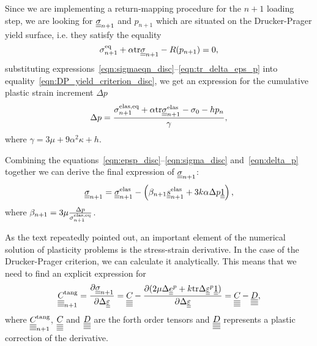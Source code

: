 \documentclass[12pt]{article}
\begin{document}
\begin{appendices}
    Since we are implementing a return-mapping procedure for the $n + 1$ loading step, we are looking for $\underline{\underline{\sigma}}_{n+1}$ and $p_{n+1}$ which are situated on the Drucker-Prager yield surface, i.e. they satisfy the equality 
    \begin{equation}\label{eqn:DP_yield_criterion_disc}
        \sigma_{n+1}^\text{eq} + \alpha \mathrm{tr} \underline{\underline{\sigma}}_{n+1} - R(p_{n+1}) = 0,
    \end{equation}
    substituting expressions~\eqref{eqn:sigmaeqn_disc}--\eqref{eqn:tr_delta_eps_p} into equality~\eqref{eqn:DP_yield_criterion_disc}, we get an expression for the cumulative plastic strain increment $\Delta p$
    \begin{equation}\label{eqn:delta_p}
        \Delta p = \frac{ \sigma_{n+1}^\text{elas,eq} + \alpha \mathrm{tr} \underline{\underline{\sigma}}_{n+1}^{\text{elas}} - \sigma_0 - h p_n}{ \gamma },
    \end{equation}
    where $\gamma = 3\mu + 9\alpha^2\kappa + h$.
    
    Combining the equations~\eqref{eqn:epsp_disc}--\eqref{eqn:sigma_disc} and~\eqref{eqn:delta_p} together we can derive the final expression of $\underline{\underline{\sigma}}_{n+1}$:
    \begin{equation}
        \underline{\underline{\sigma}}_{n+1} = \underline{\underline{\sigma}}_{n+1}^\text{elas} - \left( \beta_{n+1} \underline{\underline{s}}_{n+1}^\text{elas} + 3k\alpha \Delta p \underline{\underline{1}} \right),
    \end{equation}
    where $\beta_{n+1} = 3\mu\frac{\Delta p}{\sigma_{n+1}^\text{elas,eq}}$.

    As the text repeatedly pointed out, an important element of the numerical solution of plasticity problems is the stress-strain derivative. In the case of the Drucker-Prager criterion, we can calculate it analytically. This means that we need to find an explicit expression for 
    \begin{equation*}
        \underline{\underline{\underline{\underline{C_{}}}}}^\text{tang}_{n+1} = \frac{\partial\underline{\underline{\sigma}}_{n+1}}{\partial \Delta\underline{\underline{\varepsilon}}} = \underline{\underline{\underline{\underline{C_{}}}}} - \frac{\partial (2\mu\Delta\underline{\underline{e}}^p + k\mathrm{tr}\Delta\underline{\underline{\varepsilon}}^p\underline{\underline{1}})}{\partial\Delta\underline{\underline{\varepsilon}}} = \underline{\underline{\underline{\underline{C_{}}}}} - \underline{\underline{\underline{\underline{D}}}},
    \end{equation*}
    where $\underline{\underline{\underline{\underline{C_{}}}}}^\text{tang}_{n+1}$, $\underline{\underline{\underline{\underline{C_{}}}}}$ and $\underline{\underline{\underline{\underline{D}}}}$ are the forth order tensors and $\underline{\underline{\underline{\underline{D}}}}$ represents a plastic correction of the derivative.
    

\end{appendices}
\end{document}
